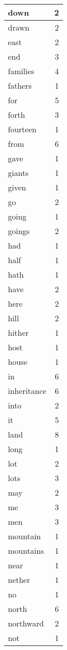 \begin{center}
\begin{longtable}{l|r}
down & 2\\ \hline 
drawn & 2\\ \hline 
east & 2\\ \hline 
end & 3\\ \hline 
families & 4\\ \hline 
fathers & 1\\ \hline 
for & 5\\ \hline 
forth & 3\\ \hline 
fourteen & 1\\ \hline 
from & 6\\ \hline 
gave & 1\\ \hline 
giants & 1\\ \hline 
given & 1\\ \hline 
go & 2\\ \hline 
going & 1\\ \hline 
goings & 2\\ \hline 
had & 1\\ \hline 
half & 1\\ \hline 
hath & 1\\ \hline 
have & 2\\ \hline 
here & 2\\ \hline 
hill & 2\\ \hline 
hither & 1\\ \hline 
host & 1\\ \hline 
house & 1\\ \hline 
in & 6\\ \hline 
inheritance & 6\\ \hline 
into & 2\\ \hline 
it & 5\\ \hline 
land & 8\\ \hline 
long & 1\\ \hline 
lot & 2\\ \hline 
lots & 3\\ \hline 
may & 2\\ \hline 
me & 3\\ \hline 
men & 3\\ \hline 
mountain & 1\\ \hline 
mountains & 1\\ \hline 
near & 1\\ \hline 
nether & 1\\ \hline 
no & 1\\ \hline 
north & 6\\ \hline 
northward & 2\\ \hline 
not & 1\\ \hline 

\end{longtable}
\end{center}
